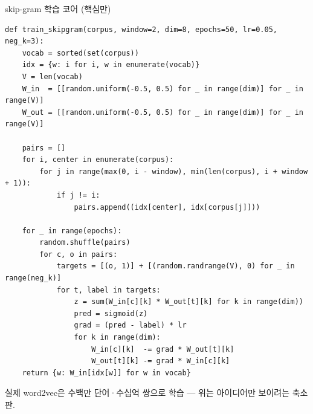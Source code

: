 \documentclass[aspectratio=169,11pt]{beamer}
\begin{document}

\begin{frame}[fragile]{skip-gram 학습 코어 (핵심만)}
\begin{lstlisting}
def train_skipgram(corpus, window=2, dim=8, epochs=50, lr=0.05, neg_k=3):
    vocab = sorted(set(corpus))
    idx = {w: i for i, w in enumerate(vocab)}
    V = len(vocab)
    W_in  = [[random.uniform(-0.5, 0.5) for _ in range(dim)] for _ in range(V)]
    W_out = [[random.uniform(-0.5, 0.5) for _ in range(dim)] for _ in range(V)]

    pairs = []
    for i, center in enumerate(corpus):
        for j in range(max(0, i - window), min(len(corpus), i + window + 1)):
            if j != i:
                pairs.append((idx[center], idx[corpus[j]]))

    for _ in range(epochs):
        random.shuffle(pairs)
        for c, o in pairs:
            targets = [(o, 1)] + [(random.randrange(V), 0) for _ in range(neg_k)]
            for t, label in targets:
                z = sum(W_in[c][k] * W_out[t][k] for k in range(dim))
                pred = sigmoid(z)
                grad = (pred - label) * lr
                for k in range(dim):
                    W_in[c][k]  -= grad * W_out[t][k]
                    W_out[t][k] -= grad * W_in[c][k]
    return {w: W_in[idx[w]] for w in vocab}
\end{lstlisting}
  {\footnotesize 실제 word2vec은 수백만 단어·수십억 쌍으로 학습 ---
  위는 아이디어만 보이려는 축소판.}
\end{frame}
\end{document}
